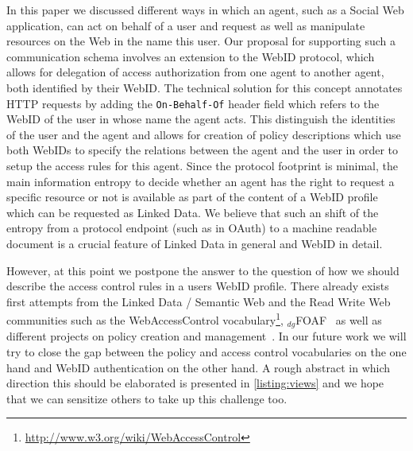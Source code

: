 \documentclass[a4paper]{llncs}
\begin{document}
In this paper we discussed different ways in which an agent, such as a Social Web application, can act on behalf of a user and request as well as manipulate resources on the Web in the name this user.
Our proposal for supporting such a communication schema involves an extension to the WebID protocol, which allows for delegation of access authorization from one agent to another agent, both identified by their WebID.
The technical solution for this concept annotates HTTP requests by adding the \lstinline|On-Behalf-Of| header field which refers to the WebID of the user in whose name the agent acts.
This distinguish the identities of the user and the agent and allows for creation of policy descriptions which use both WebIDs to specify the relations between the agent and the user in order to setup the access rules for this agent.
Since the protocol footprint is minimal, the main information entropy to decide whether an agent has the right to request a specific resource or not is available as part of the content of a WebID profile which can be requested as Linked Data.
We believe that such an shift of the entropy from a protocol endpoint (such as in OAuth) to a machine readable document is a crucial feature of Linked Data in general and WebID in detail.

However, at this point we postpone the answer to the question of how we should describe the access control rules in a users WebID profile.
There already exists first attempts from the Linked Data / Semantic Web and the Read Write Web communities such as the WebAccessControl vocabulary\footnote{\url{http://www.w3.org/wiki/WebAccessControl}}, $_{dg}$FOAF~\cite{schwagereit-f-2010-181-a} as well as different projects on policy creation and management~\cite{kagal-l-2005--a}.
In our future work we will try to close the gap between the policy and access control vocabularies on the one hand and WebID authentication on the other hand.
A rough abstract in which direction this should be elaborated is presented in \autoref{listing:views} and we hope that we can sensitize others to take up this challenge too.



\end{document}
